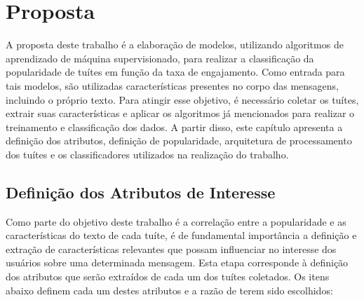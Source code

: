 \documentclass[oneside,openright,12pt]{ufsm_2015} %
\begin{document}



\chapter{Proposta}
\label{sec:proposta}

    \par A proposta deste trabalho é a elaboração de modelos, utilizando algoritmos de aprendizado de máquina supervisionado, para realizar a classificação da popularidade de tuítes em função da taxa de engajamento. Como entrada para tais modelos, são utilizadas características presentes no corpo das mensagens, incluindo o próprio texto. Para atingir esse objetivo, é necessário coletar os tuítes, extrair suas características e aplicar os algoritmos já mencionados para realizar o treinamento e classificação dos dados. A partir disso, este capítulo apresenta a definição dos atributos, definição de popularidade, arquitetura de processamento dos tuítes e os classificadores utilizados na realização do trabalho.


\section{Definição dos Atributos de Interesse}
\label{sec:prop-def-atributos}

    \par Como parte do objetivo deste trabalho é a correlação entre a popularidade e as características do texto de cada tuíte, é de fundamental importância a definição e extração de características relevantes que possam influenciar no interesse dos usuários sobre uma determinada mensagem. Esta etapa corresponde à definição dos atributos que serão extraídos de cada um dos tuítes coletados. Os itens abaixo definem cada um destes atributos e a razão de terem sido escolhidos:
\end{document}
